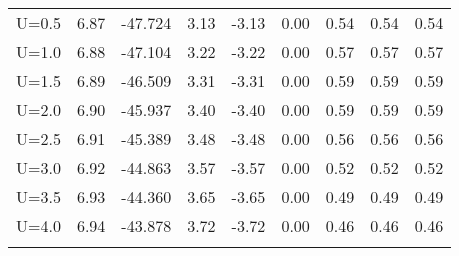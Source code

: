 \begin{table}[H]
\begin{tabular}{cccccc|ccc}
		U=0.5 & 6.87 & -47.724 & 3.13 & -3.13 & 0.00 & 0.54 & 0.54 & 0.54 \\
		U=1.0 & 6.88 & -47.104 & 3.22 & -3.22 & 0.00 & 0.57 & 0.57 & 0.57 \\
		U=1.5 & 6.89 & -46.509 & 3.31 & -3.31 & 0.00 & 0.59 & 0.59 & 0.59 \\
		U=2.0 & 6.90 & -45.937 & 3.40 & -3.40 & 0.00 & 0.59 & 0.59 & 0.59 \\
		U=2.5 & 6.91 & -45.389 & 3.48 & -3.48 & 0.00 & 0.56 & 0.56 & 0.56 \\
		U=3.0 & 6.92 & -44.863 & 3.57 & -3.57 & 0.00 & 0.52 & 0.52 & 0.52 \\
		U=3.5 & 6.93 & -44.360 & 3.65 & -3.65 & 0.00 & 0.49 & 0.49 & 0.49 \\
		U=4.0 & 6.94 & -43.878 & 3.72 & -3.72 & 0.00 & 0.46 & 0.46 & 0.46 \\
		\bottomrule
		\bottomrule
		\label{tab:4.3}
	\end{tabular}
\end{table}




